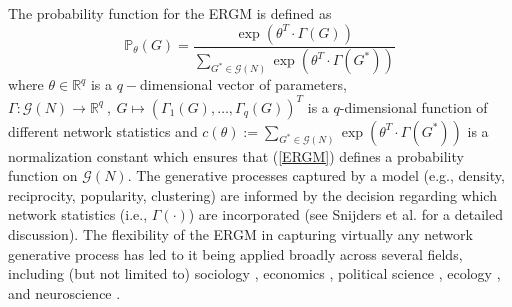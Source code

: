 \documentclass{llncs}
\begin{document}
The probability function for the ERGM is defined as
\begin{equation}
\mathbb{P}_{\theta}(G)=\dfrac{\exp(\theta^T \cdot \Gamma(G))}{\sum_{G^* \in \mathcal{G}(N)} \exp(\theta^T \cdot \Gamma(G^*))} 
\label{ERGM}
\end{equation}
%
where $\theta \in \mathbb{R}^q$ is a $q-$dimensional vector of parameters, $\Gamma:\mathcal{G}(N) \to \mathbb{R}^q~,~G \mapsto (\Gamma_1(G),\dots,\Gamma_q(G))^T$ is a $q$-dimensional function of different network statistics and $c(\theta):= \sum_{G^* \in \mathcal{G}(N)} \exp(\theta^T \cdot \Gamma(G^*))$ is a normalization constant which ensures that (\ref{ERGM}) defines a probability function on $\mathcal{G}(N)$.
%
The generative processes captured by a model (e.g., density, reciprocity, popularity, clustering) are informed by the decision regarding which network statistics (i.e., $\Gamma(\cdot)$) are incorporated (see Snijders et al. \cite{SnijdersTomA.B..2006} for a detailed discussion). The flexibility of the ERGM in capturing virtually any network generative process has led to it being applied broadly across several fields, including (but not limited to) sociology \cite{smith2016ethnic}%
, economics \cite{lomi2012networks}, political science \cite{Cranmer.2011}%
, ecology \cite{dey2014individual}%
, and neuroscience \cite{simpson2011exponential}.%
\end{document}
